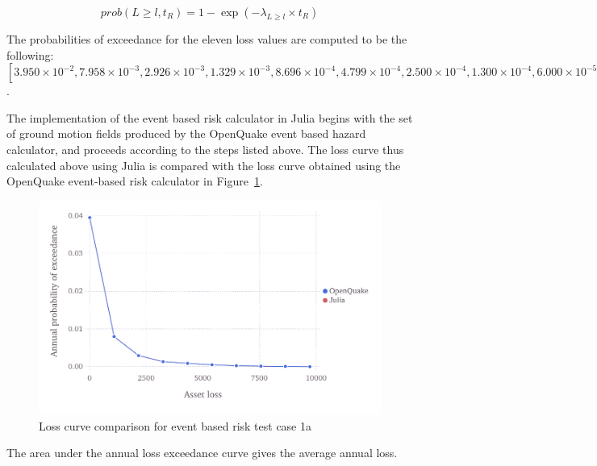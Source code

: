 \begin{equation}
	prob(L \geq l, t_R) = 1 - \exp (-\lambda_{L \geq l} \times t_R)
	\label{eqn:ebr-rate-to-prob}
\end{equation}

The probabilities of exceedance for the eleven loss values are computed to be the following: $[3.950\times10^{-2}, 7.958\times10^{-3}, 2.926\times10^{-3}, 1.329\times10^{-3}, 8.696\times10^{-4}, 4.799\times10^{-4}, 2.500\times10^{-4}, 1.300\times10^{-4}, 6.000\times10^{-5}, 0.000]$.

The implementation of the event based risk calculator in Julia begins with the set of ground motion fields produced by the OpenQuake event based hazard calculator, and proceeds according to the steps listed above. The loss curve thus calculated above using Julia is compared with the loss curve obtained using the OpenQuake event-based risk calculator in Figure~\ref{fig:lc-ebr-1a}.

\begin{figure}[htbp]
\centering
\includegraphics[width=12cm]{qareport/figures/fig-lc-ebr-1a}
\caption{Loss curve comparison for event based risk test case 1a}
\label{fig:lc-ebr-1a}
\end{figure}

The area under the annual loss exceedance curve gives the average annual loss.